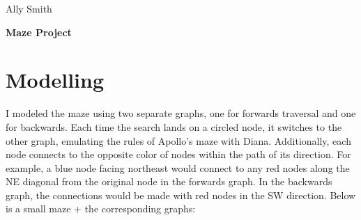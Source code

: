 \documentclass[12pt]{article}
\begin{document}
\newcommand{\I}{\mbox{{\em Int}}}
\newcommand{\lt}{\mbox{{\em left}}}
\newcommand{\rt}{\mbox{{\em right}}}
\newcommand{\ld}{\Delta^l}
\newcommand{\rd}{\Delta^r}
\newcommand{\lsp}[1]{\large\renewcommand{\baselinestretch}{#1}\normalsize}
\newcommand{\hsp}{\hspace{.2in}}

\def\Endwhile{\mbox{\bf endwhile\ }}
\def\Or{\mbox{\bf or\ }}
\def\Do{\mbox{\bf do\ }}
\def\Downto{\mbox{\bf downto\ }}
\def\Int{\mbox{\bf int\ }}
\def\To{\mbox{\bf to\ }}
\def\Repeat{\mbox{\bf repeat\ }}
\def\Until{\mbox{\bf until\ }}
\def\Return{\mbox{\bf return\ }}
\def\Not{\mbox{\bf not\ }}
\def\And{\mbox{\bf and\ }}
\def\For{\mbox{\bf for\ }}
\def\Foreach{\mbox{\bf foreach\ }}
\def\Else{\mbox{\bf else\ }}
\def\Elseif{\mbox{\bf elseif\ }}
\def\End{\mbox{\bf end\ }}
\def\If{\mbox{\bf if\ }}
\def\Mod{\mbox{\bf \ mod\ }}
\def\Then{\mbox{\bf then\ }}
\def\While{\mbox{\bf while\ }}
\def\Output{\mbox{\bf output\ }}


\lsp{1}
\pagestyle{plain}
\hfill Ally Smith
\begin{center}
{\bf
Maze Project
}
\end{center}

\section{Modelling}

I modeled the maze using two separate graphs, one for forwards traversal and
one for backwards. Each time the search lands on a circled node, it switches to
the other graph, emulating the rules of Apollo's maze with Diana. Additionally,
each node connects to the opposite color of nodes within the path of its
direction. For example, a blue node facing northeast would connect to any red
nodes along the NE diagonal from the original node in the forwards graph. In
the backwards graph, the connections would be made with red nodes in the SW
direction. Below is a small maze + the corresponding graphs:
\end{document}
